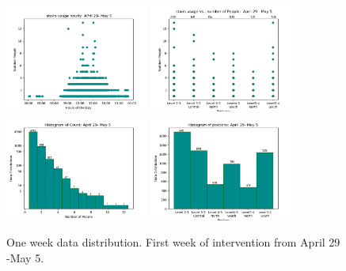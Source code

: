 \begin{figure}[!h]
    \centering
   
    \includegraphics[width=0.42\textwidth]{image/Chapters/Chapter6/oneWeekhourly.png}%
    \includegraphics[width=0.42\textwidth]{image/Chapters/Chapter6/PositionCountOneWeek.png}\hfill
    \includegraphics[width=0.42\textwidth]{image/Chapters/Chapter6/oneweekCountDistributon.png}%
    \includegraphics[width=0.42\textwidth]{image/Chapters/Chapter6/oneweekPositionDistributon.png}
    \caption{One week data distribution. First week of intervention from April 29 -May 5.}
    \label{distduring}
\end{figure}

